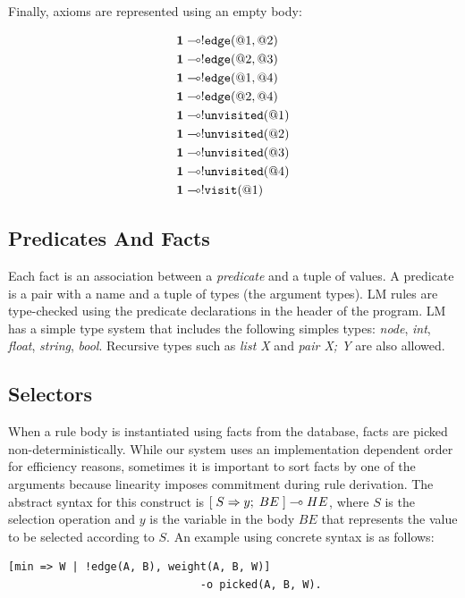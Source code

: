 Finally, axioms are represented using an empty body:

\nopagebreak

\begin{align}
\mathbf{1} \multimap & {!} \mathtt{edge}(@1, @2) \\
\mathbf{1} \multimap & {!} \mathtt{edge}(@2, @3) \\
\mathbf{1} \multimap & {!} \mathtt{edge}(@1, @4) \\
\mathbf{1} \multimap & {!} \mathtt{edge}(@2, @4) \\
\mathbf{1} \multimap & {!} \mathtt{unvisited}(@1)  \\
\mathbf{1} \multimap & {!} \mathtt{unvisited}(@2) \\
\mathbf{1} \multimap & {!} \mathtt{unvisited}(@3) \\
\mathbf{1} \multimap & {!} \mathtt{unvisited}(@4) \\
\mathbf{1} \multimap & {!} \mathtt{visit}(@1)
\end{align}

\subsection{Predicates And Facts}

Each fact is an association between a \emph{predicate} and a tuple of values. A
predicate is a pair with a name and a tuple of types (the argument types). LM
rules are type-checked using the predicate declarations in the header of the
program. LM has a simple type system that includes the following simples types:
\emph{node}, \emph{int}, \emph{float}, \emph{string}, \emph{bool}. Recursive
types such as \emph{list X} and \emph{pair X; Y} are also allowed.

\subsection{Selectors}

When a rule body is instantiated using facts from the database, facts are picked
non-deterministically. While our system uses an implementation dependent order
for efficiency reasons, sometimes it is important to sort facts by one of the
arguments because linearity imposes commitment during rule derivation. The
abstract syntax for this construct is $[\; S \Rightarrow y; \; BE \;] \multimap HE$, where $S$ is
the selection operation and $y$ is the variable in the body $BE$ that represents
the value to be selected according to $S$. An example using concrete syntax is
as follows:

\begin{Verbatim}[fontsize=\codesize]
[min => W | !edge(A, B), weight(A, B, W)]
                              -o picked(A, B, W).
\end{Verbatim}

